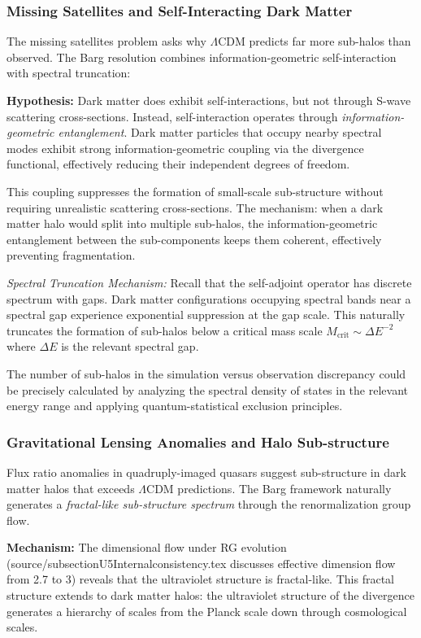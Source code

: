 \documentclass[12pt,a4paper]{article}
\begin{document}
\subsubsection{Missing Satellites and Self-Interacting Dark Matter}

The missing satellites problem asks why $\Lambda$CDM predicts far more sub-halos than observed. The Barg resolution combines information-geometric self-interaction with spectral truncation:

\textbf{Hypothesis:} Dark matter does exhibit self-interactions, but not through S-wave scattering cross-sections. Instead, self-interaction operates through \textit{information-geometric entanglement}. Dark matter particles that occupy nearby spectral modes exhibit strong information-geometric coupling via the divergence functional, effectively reducing their independent degrees of freedom.

This coupling suppresses the formation of small-scale sub-structure without requiring unrealistic scattering cross-sections. The mechanism: when a dark matter halo would split into multiple sub-halos, the information-geometric entanglement between the sub-components keeps them coherent, effectively preventing fragmentation.

\textit{Spectral Truncation Mechanism:} Recall that the self-adjoint operator has discrete spectrum with gaps. Dark matter configurations occupying spectral bands near a spectral gap experience exponential suppression at the gap scale. This naturally truncates the formation of sub-halos below a critical mass scale $M_{\text{crit}} \sim \Delta E^{-2}$ where $\Delta E$ is the relevant spectral gap.

The number of sub-halos in the simulation versus observation discrepancy could be precisely calculated by analyzing the spectral density of states in the relevant energy range and applying quantum-statistical exclusion principles.

\subsubsection{Gravitational Lensing Anomalies and Halo Sub-structure}

Flux ratio anomalies in quadruply-imaged quasars suggest sub-structure in dark matter halos that exceeds $\Lambda$CDM predictions. The Barg framework naturally generates a \textit{fractal-like sub-structure spectrum} through the renormalization group flow.

\textbf{Mechanism:} The dimensional flow under RG evolution (source/subsectionU5Internalconsistency.tex discusses effective dimension flow from 2.7 to 3) reveals that the ultraviolet structure is fractal-like. This fractal structure extends to dark matter halos: the ultraviolet structure of the divergence generates a hierarchy of scales from the Planck scale down through cosmological scales.
\end{document}
